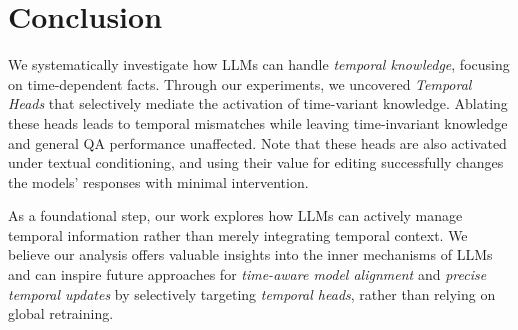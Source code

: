 \section{Conclusion}
\label{sec:conclusion}
We systematically investigate how LLMs can handle \emph{temporal knowledge}, focusing on time-dependent facts. 
Through our experiments, we uncovered \emph{Temporal Heads} that selectively mediate the activation of time-variant knowledge.
Ablating these heads leads to temporal mismatches while leaving time-invariant knowledge and general QA performance unaffected.
Note that these heads are also activated under textual conditioning, and using their value for editing successfully changes the models' responses with minimal intervention.

As a foundational step, our work explores how LLMs can actively manage temporal information rather than merely integrating temporal context.
We believe our analysis offers valuable insights into the inner mechanisms of LLMs and can inspire future approaches for \emph{time-aware model alignment} and \emph{precise temporal updates} by selectively targeting \emph{temporal heads}, rather than relying on global retraining. 
